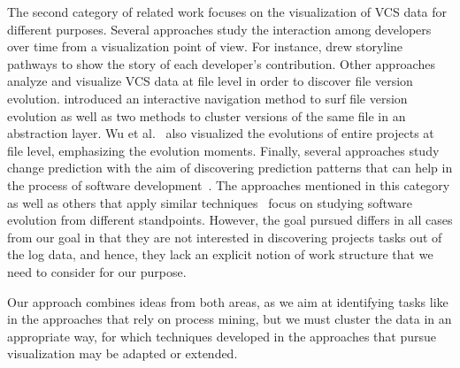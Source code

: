 The second category of related work focuses on the visualization of VCS data %
for different purposes.
Several approaches study the interaction among developers over time from a visualization point of view. For instance, \cite{ogawa2010software} drew storyline pathways to show the story of each developer's contribution. Other approaches analyze and visualize VCS data at file level in order to discover file version evolution. \cite{voinea_multiscale_2006} introduced an interactive navigation method to surf file version evolution as well as two methods to cluster versions of the same file in an abstraction layer. Wu et al.~\cite{jingwei_evolution_2004} also visualized the evolutions of entire projects at file level, emphasizing the evolution moments.
Finally, several approaches study change prediction with the aim of discovering prediction patterns that can help in the process of software development~\cite{DBLP:journals/tse/ZimmermannWDZ05,ying_predicting_2004}.
The approaches mentioned in this category as well as others that apply similar techniques~\cite{feldt2013supporting,kagdi_mining_2006,dambros_flexible_2008} focus on studying software evolution from different standpoints. However, the goal pursued differs in all cases from our goal in that they are not interested in discovering projects tasks out of the log data, and hence, they lack an explicit notion of work structure that we need to consider for our purpose.

Our approach combines ideas from both areas, as we aim at identifying tasks like in the approaches that rely on process mining, but we must cluster the data in an appropriate way, for which techniques developed in the approaches that pursue visualization may be adapted or extended.

%

